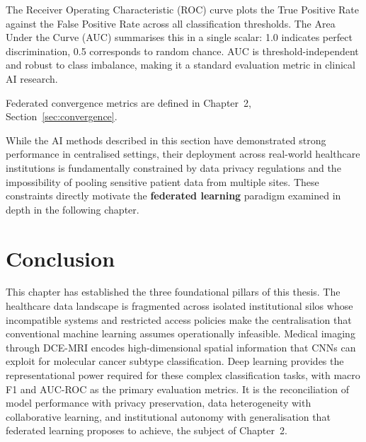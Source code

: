 The Receiver Operating Characteristic (ROC) curve plots the True Positive Rate
against the False Positive Rate across all classification thresholds.
The Area Under the Curve (AUC) summarises this in a single scalar: 1.0 indicates
perfect discrimination, 0.5 corresponds to random chance.
AUC is threshold-independent and robust to class imbalance, making it a standard
evaluation metric in clinical AI research.

Federated convergence metrics are defined in Chapter~2,
Section~\ref{sec:convergence}.

\bigskip

While the AI methods described in this section have demonstrated strong performance
in centralised settings, their deployment across real-world healthcare institutions
is fundamentally constrained by data privacy regulations and the impossibility of
pooling sensitive patient data from multiple sites.
These constraints directly motivate the \textbf{federated learning} paradigm
examined in depth in the following chapter.

\section{Conclusion}

This chapter has established the three foundational pillars of this thesis.
The healthcare data landscape is fragmented across isolated institutional silos
whose incompatible systems and restricted access policies make the centralisation
that conventional machine learning assumes operationally infeasible.
Medical imaging through DCE-MRI encodes high-dimensional spatial information that
CNNs can exploit for molecular cancer subtype classification.
Deep learning provides the representational power required for these complex
classification tasks, with macro F1 and AUC-ROC as the primary evaluation metrics.
It is the reconciliation of model performance with privacy preservation, data
heterogeneity with collaborative learning, and institutional autonomy with
generalisation that federated learning proposes to achieve, the subject of
Chapter~2.
